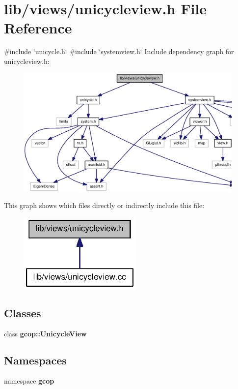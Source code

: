 \section{lib/views/unicycleview.h \-File \-Reference}
\label{unicycleview_8h}
{\ttfamily \#include \char`\"{}unicycle.\-h\char`\"{}}\*
{\ttfamily \#include \char`\"{}systemview.\-h\char`\"{}}\*
\-Include dependency graph for unicycleview.\-h\-:
\nopagebreak
\begin{figure}[H]
\begin{center}
\leavevmode
\includegraphics[width=350pt]{unicycleview_8h__incl}
\end{center}
\end{figure}
\-This graph shows which files directly or indirectly include this file\-:
\nopagebreak
\begin{figure}[H]
\begin{center}
\leavevmode
\includegraphics[width=172pt]{unicycleview_8h__dep__incl}
\end{center}
\end{figure}
\subsection*{\-Classes}
\begin{DoxyCompactItemize}
\item 
class {\bf gcop\-::\-Unicycle\-View}
\end{DoxyCompactItemize}
\subsection*{\-Namespaces}
\begin{DoxyCompactItemize}
\item 
namespace {\bf gcop}
\end{DoxyCompactItemize}
